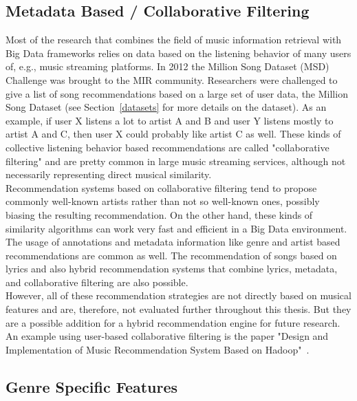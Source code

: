 \subsection{Metadata Based / Collaborative Filtering}\label{collaborative}

Most of the research that combines the field of music information retrieval with Big Data frameworks relies on data based on the listening behavior of many users of, e.g., music streaming platforms. In 2012 the Million Song Dataset (MSD) Challenge was brought to the MIR community. Researchers were challenged to give a list of song recommendations based on a large set of user data, the Million Song Dataset (see Section~\ref{datasets} for more details on the dataset). As an example, if user X listens a lot to artist A and B and user Y listens mostly to artist A and C, then user X could probably like artist C as well. These kinds of collective listening behavior based recommendations are called "collaborative filtering" and are pretty common in large music streaming services, although not necessarily representing direct musical similarity.~\cite[pp. 192f]{knees1}\\
Recommendation systems based on collaborative filtering tend to propose commonly well-known artists rather than not so well-known ones, possibly biasing the resulting recommendation. On the other hand, these kinds of similarity algorithms can work very fast and efficient in a Big Data environment. The usage of annotations and metadata information like genre and artist based recommendations are common as well. The recommendation of songs based on lyrics and also hybrid recommendation systems that combine lyrics, metadata, and collaborative filtering are also possible.\\
However, all of these recommendation strategies are not directly based on musical features and are, therefore, not evaluated further throughout this thesis. But they are a possible addition for a hybrid recommendation engine for future research. 
An example using user-based collaborative filtering is the paper "Design and Implementation of Music Recommendation System Based on Hadoop"~\cite{metadat1}. 

\subsection{Genre Specific Features}

